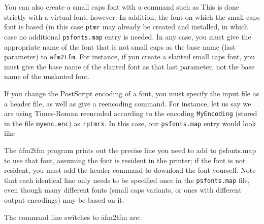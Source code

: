 You can also create a small caps font with a command such as
\noindent
This is done strictly with a virtual font, however.  In addition,
the font on which the small caps font is based (in this case
{\tt ptmr} may already be created and installed, in which case no
additional {\tt psfonts.map} entry is needed.
In any case, you must give the appropriate name of the font that
is not small caps as the base name (last parameter) to {\tt afm2tfm}.
For instance, if you create a slanted small caps font, you must
give the base name of the slanted font as that last parameter,
not the base name of the unslanted font.

If you change the PostScript encoding of a font, you must specify the
input file as a header file, as well as give a reencoding
command.  For instance, let us say we are using Times-Roman
reencoded according to the encoding {\tt MyEncoding} (stored
in the file {\tt myenc.enc}) as {\tt rptmrx}.  In this case,
our {\tt psfonts.map} entry would look like

The \.{afm2tfm} program prints out the precise line you need to
add to \.{psfonts.map} to use that font, assuming the font is
resident in the printer; if the font is not resident, you must
add the header command to download the font yourself.  Note that
each identical line only needs to be specified once in the
{\tt psfonts.map} file, even though many different fonts (small
caps variants, or ones with different output encodings) may be
based on it.

The command line switches to \.{afm2tfm} are:

